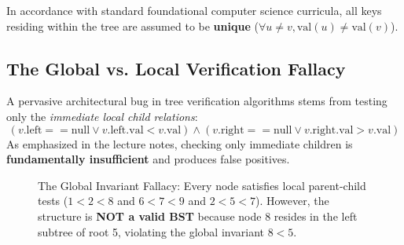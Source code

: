 \documentclass[10pt,journal,compsoc,onecolumn]{IEEEtran}
\begin{document}
In accordance with standard foundational computer science curricula, all keys residing within the tree are assumed to be \textbf{unique} ($\forall u \ne v, \mathrm{val}(u) \ne \mathrm{val}(v)$).

\subsection{The Global vs. Local Verification Fallacy}

A pervasive architectural bug in tree verification algorithms stems from testing only the \emph{immediate local child relations}:
\begin{equation}
    (v.\mathrm{left} == \mathrm{null} \lor v.\mathrm{left}.\mathrm{val} < v.\mathrm{val}) \land (v.\mathrm{right} == \mathrm{null} \lor v.\mathrm{right}.\mathrm{val} > v.\mathrm{val})
\end{equation}
As emphasized in the lecture notes, checking only immediate children is \textbf{fundamentally insufficient} and produces false positives.

\begin{figure}[htbp]
\centering
{}
\caption{The Global Invariant Fallacy: Every node satisfies local parent-child tests ($1 < 2 < 8$ and $6 < 7 < 9$ and $2 < 5 < 7$). However, the structure is \textbf{NOT a valid BST} because node 8 resides in the left subtree of root 5, violating the global invariant $8 < 5$.}
\label{fig:bst_fallacy}
\end{figure}
\end{document}
